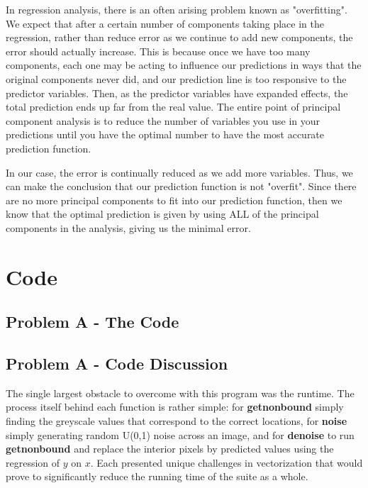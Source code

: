 \documentclass{article}
\begin{document}
In regression analysis, there is an often arising problem known as "overfitting".  We expect that after a certain number of components taking place in the regression, rather than reduce error as we continue to add new components, the error should actually increase.  This is because once we have too many components, each one may be acting to influence our predictions in ways that the original components never did, and our prediction line is too responsive to the predictor variables.  Then, as the predictor variables have expanded effects, the total prediction ends up far from the real value.  The entire point of principal component analysis is to reduce the number of variables you use in your predictions until you have the optimal number to have the most accurate prediction function.

In our case, the error is continually reduced as we add more variables.  Thus, we can make the conclusion that our prediction function is not "overfit".  Since there are no more principal components to fit into our prediction function, then we know that the optimal prediction is given by using ALL of the principal components in the analysis, giving us the minimal error.

\newpage
\appendix
\section{Code}

\subsection{Problem A - The Code}

\subsection{Problem A - Code Discussion}
The single largest obstacle to overcome with this program was the runtime.  The process itself behind each function is rather simple: for \textbf{getnonbound} simply finding the greyscale values that correspond to the correct locations, for \textbf{noise} simply generating random U(0,1) noise across an image, and for \textbf{denoise} to run \textbf{getnonbound} and replace the interior pixels by predicted values using the regression of $y$ on $x$.  Each presented unique challenges in vectorization that would prove to significantly reduce the running time of the suite as a whole.
\end{document}
